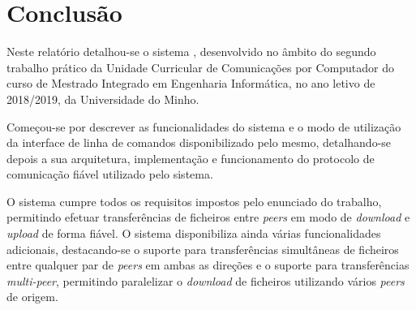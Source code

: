 
\section{Conclusão}
\label{sec:conc}

Neste relatório detalhou-se o sistema \SYS, desenvolvido no âmbito do segundo trabalho prático da Unidade Curricular de Comunicações por Computador do curso de Mestrado Integrado em Engenharia Informática, no ano letivo de 2018/2019, da Universidade do Minho.

Começou-se por descrever as funcionalidades do sistema e o modo de utilização da interface de linha de comandos disponibilizado pelo mesmo, detalhando-se depois a sua arquitetura, implementação e funcionamento do protocolo de comunicação fiável utilizado pelo sistema.


O sistema \SYS cumpre todos os requisitos impostos pelo enunciado do trabalho, permitindo efetuar transferências de ficheiros entre \emph{peers} em modo de \emph{download} e \emph{upload} de forma fiável. O sistema disponibiliza ainda várias funcionalidades adicionais, destacando-se  o suporte para transferências simultâneas de ficheiros entre qualquer par de \emph{peers} em ambas as direções e  o suporte para transferências \emph{multi-peer}, permitindo paralelizar o \emph{download} de ficheiros utilizando vários \emph{peers} de origem.

